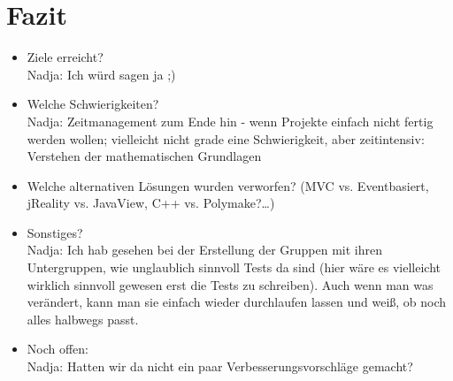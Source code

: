 \section{Fazit}
    \begin{itemize}
        \item Ziele erreicht?\\
        Nadja: Ich würd sagen ja ;)
        \item Welche Schwierigkeiten?\\
   		Nadja: Zeitmanagement zum Ende hin - wenn Projekte einfach nicht fertig werden wollen; vielleicht nicht grade eine Schwierigkeit, aber zeitintensiv: Verstehen der mathematischen Grundlagen
        \item Welche alternativen Lösungen wurden verworfen? (MVC vs. Eventbasiert, jReality vs. JavaView, C++ vs. Polymake?\dots)
        \item Sonstiges?\\
        Nadja: Ich hab gesehen bei der Erstellung der Gruppen mit ihren Untergruppen, wie unglaublich sinnvoll Tests da sind (hier wäre es vielleicht wirklich sinnvoll gewesen erst die Tests zu schreiben). Auch wenn man was verändert, kann man sie einfach wieder durchlaufen lassen und weiß, ob noch alles halbwegs passt.
        \item Noch offen:\\
        Nadja: Hatten wir da nicht ein paar Verbesserungsvorschläge gemacht?
            
    \end{itemize}